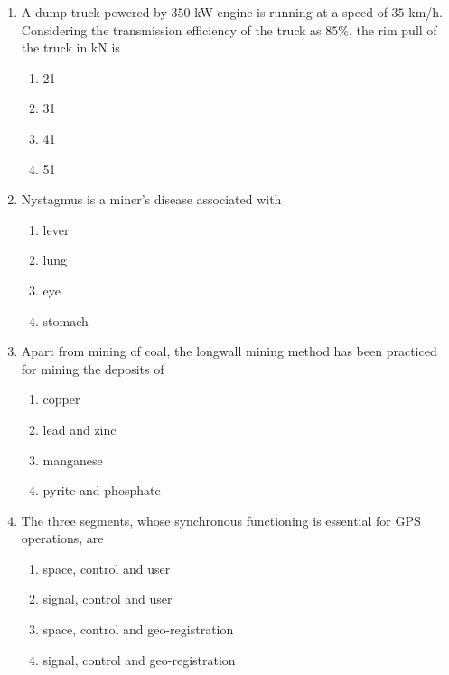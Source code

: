 \documentclass[journal]{IEEEtran}
\begin{document}
\begin{enumerate}[leftmargin=0pt]
\item A dump truck powered by $350$ kW engine is running at a speed of $35$ km/h. Considering the
transmission efficiency of the truck as $85\%$, the rim pull of the truck in kN is
\begin{multicols}{2}
\begin{enumerate}[label=(\Alph*), itemsep=0pt, topsep=2pt]
  \item 21
  \item 31
  \item 41
  \item 51
\end{enumerate}
\end{multicols}
\hfill{}

\item Nystagmus is a miner’s disease associated with
\begin{multicols}{2}
\begin{enumerate}[label=(\Alph*), itemsep=0pt, topsep=2pt]
  \item lever
  \item lung
  \item eye
  \item stomach
\end{enumerate}
\end{multicols}
\hfill{}

\item Apart from mining of coal, the longwall mining method has been practiced for mining the deposits of
\begin{multicols}{2}
\begin{enumerate}[label=(\Alph*), itemsep=0pt, topsep=2pt]
  \item copper
  \item lead and zinc
  \item manganese
  \item pyrite and phosphate
\end{enumerate}
\end{multicols}
\hfill{}

\item The three segments, whose synchronous functioning is essential for GPS operations, are
\begin{multicols}{2}
\begin{enumerate}[label=(\Alph*), itemsep=0pt, topsep=2pt]
  \item space, control and user
  \item signal, control and user
  \item space, control and geo-registration
  \item signal, control and geo-registration
\end{enumerate}
\end{multicols}
\hfill{}


\end{enumerate}
\end{document}
